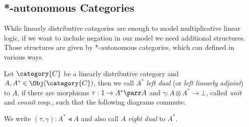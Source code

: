\documentclass[DIN, pagenumber=false, fontsize=11pt, parskip=half, colorinlistoftodos, svgnames]{scrartcl}
\newcommand{\formatnote}[2][]{\todo[color=cyan!40, #1]{#2}}
\begin{document}
	\subsection{*-autonomous Categories}
	\label{sec: autoCats}
	
	While linearly distributive categories are enough to  model multiplicative linear logic, if we want to include negation in our model we need additional structures. Those structures are given by *-autonomous categories, which can defined in various ways.
	
	\begin{definition}
		\label{def: dualObj}
		Let $\category{C} $ be a linearly distributive category and $A, A^* \in \Obj(\category{C}) $, then we call $A^* $ \emph{left dual} (or \emph{left linearly adjoint}) to $A$, if there are morphisms $\tau: 1 \rightarrow A^* \parr A$ and $\gamma: A \otimes A^* \rightarrow \bot $, called \emph{unit} and \emph{counit} resp., such that the following diagrams commute:
		\begin{center}
		\end{center}
		
		We write $(\tau, \gamma): A^* \dashV A $ and also call $A$ \emph{right dual} to $A^*$. 
		
	\end{definition}
	
\end{document}
